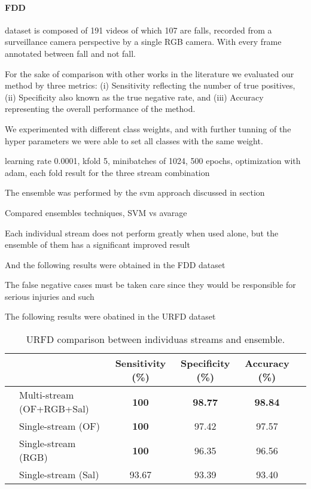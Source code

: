 \documentclass[conference]{IEEEtran}
\begin{document}
\paragraph{FDD} dataset is composed of 191 videos of which 107 are falls, recorded from a surveillance camera perspective by a single RGB camera. With every frame annotated between fall and not fall.

For the sake of comparison with other works in the literature we evaluated our method by three metrics: (i) Sensitivity reflecting the number of true positives, (ii) Specificity also known as the true negative rate, and (iii) Accuracy representing the overall performance of the method.

We experimented with different class weights, and with further tunning of the hyper parameters we were able to set all classes with the same weight.

learning rate 0.0001, kfold 5, minibatches of 1024, 500 epochs, optimization with adam, each fold result for the three stream combination

The ensemble was performed by the svm approach discussed in section

Compared ensembles techniques, SVM vs avarage

Each individual stream does not perform greatly when used alone, but the ensemble of them has a significant improved result

And the following results were obtained in the FDD dataset

The false negative cases must be taken care since they would be responsible for serious injuries and such

The following results were obatined in the URFD dataset

\begin{table*}[t]
\centering
\caption{URFD comparison between individuas streams and ensemble.}
\label{tab:urfd-ensem}
\begin{tabular}{llcccl}
\hline
 &  & Sensitivity (\%) & Specificity (\%) & Accuracy (\%) &  \\ \hline
 & Multi-stream (OF+RGB+Sal) & \textbf{100} & \textbf{98.77} & \textbf{98.84} &  \\
 & Single-stream (OF) & \textbf{100} & 97.42 & 97.57 &  \\
 & Single-stream (RGB) & \textbf{100} & 96.35 & 96.56 &  \\
 & Single-stream (Sal) & 93.67 & 93.39 & 93.40 & \\ \hline
\end{tabular}
\end{table*}
\end{document}
